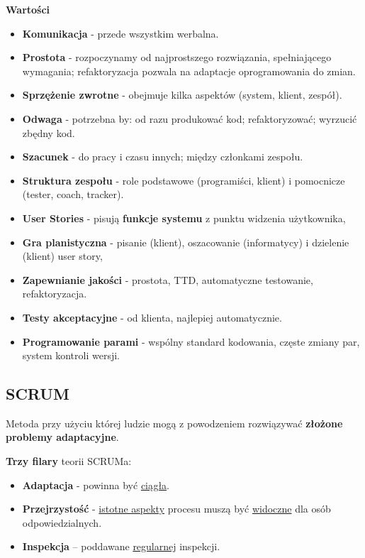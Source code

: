 \documentclass[a4paper]{article}
\begin{document}
    \textbf{Wartości}
    \begin{itemize}
        \item \textbf{Komunikacja} - przede wszystkim werbalna.
        \item \textbf{Prostota} - rozpoczynamy od najprostszego rozwiązania, spełniającego
        wymagania; refaktoryzacja pozwala na adaptacje oprogramowania do zmian.
        \item \textbf{Sprzężenie zwrotne} - obejmuje kilka aspektów (system, klient, zespół).
        \item \textbf{Odwaga} - potrzebna by: od razu produkować kod; refaktoryzować; wyrzucić zbędny kod.
        \item \textbf{Szacunek} - do pracy i czasu innych; między członkami zespołu.
    \end{itemize}

    \begin{itemize}
        \item \textbf{Struktura zespołu} - role podstawowe (programiści, klient) i pomocnicze
        (tester, coach, tracker).

        \item \textbf{User Stories} - pisują \textbf{funkcje systemu} z punktu widzenia użytkownika,

        \item \textbf{Gra planistyczna} - pisanie (klient), oszacowanie (informatycy) i dzielenie
        (klient) user story,

        \item \textbf{Zapewnianie jakości} - prostota, TTD, automatyczne testowanie, refaktoryzacja.

        \item \textbf{Testy akceptacyjne} - od klienta, najlepiej automatycznie.

        \item \textbf{Programowanie parami} - wspólny standard kodowania, częste zmiany par, system
        kontroli wersji.
    \end{itemize}

    \subsection{SCRUM}
    Metoda przy użyciu której ludzie mogą z powodzeniem rozwiązywać \textbf{złożone problemy
    adaptacyjne}.

    \textbf{Trzy filary} teorii SCRUMa:
    \begin{itemize}
        \item \textbf{Adaptacja} - powinna być \underline{ciągła}.
        \item \textbf{Przejrzystość} - \underline{istotne aspekty} procesu
        muszą być \underline{widoczne} dla osób odpowiedzialnych.
        \item \textbf{Inspekcja} – poddawane \underline{regularnej} inspekcji.
    \end{itemize}
\end{document}
